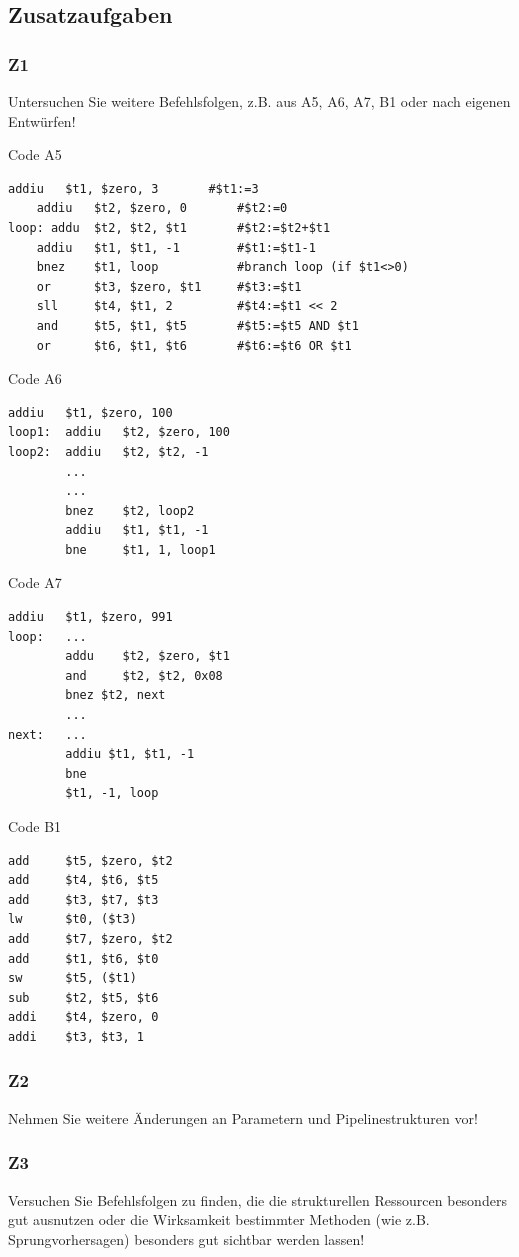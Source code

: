 \documentclass[a4paper,12pt,titlepage]{scrartcl}
\begin{document}
\subsection*{Zusatzaufgaben}
\subsubsection*{Z1}
Untersuchen Sie weitere Befehlsfolgen, z.B. aus A5, A6, A7, B1 oder nach eigenen Entwürfen!

Code A5
\begin{lstlisting}[basicstyle=\tiny]
    addiu   $t1, $zero, 3       #$t1:=3
    addiu   $t2, $zero, 0       #$t2:=0
loop: addu  $t2, $t2, $t1       #$t2:=$t2+$t1
    addiu   $t1, $t1, -1        #$t1:=$t1-1
    bnez    $t1, loop           #branch loop (if $t1<>0)
    or      $t3, $zero, $t1     #$t3:=$t1
    sll     $t4, $t1, 2         #$t4:=$t1 << 2
    and     $t5, $t1, $t5       #$t5:=$t5 AND $t1
    or      $t6, $t1, $t6       #$t6:=$t6 OR $t1
\end{lstlisting}

Code A6
\begin{lstlisting}[basicstyle=\tiny]
        addiu   $t1, $zero, 100
loop1:  addiu   $t2, $zero, 100
loop2:  addiu   $t2, $t2, -1
        ...
        ...
        bnez    $t2, loop2
        addiu   $t1, $t1, -1
        bne     $t1, 1, loop1
\end{lstlisting}

Code A7
\begin{lstlisting}[basicstyle=\tiny]
        addiu   $t1, $zero, 991
loop:   ...
        addu    $t2, $zero, $t1
        and     $t2, $t2, 0x08
        bnez $t2, next
        ...
next:   ...
        addiu $t1, $t1, -1
        bne
        $t1, -1, loop
\end{lstlisting}

Code B1
\begin{lstlisting}[basicstyle=\tiny]
add     $t5, $zero, $t2
add     $t4, $t6, $t5
add     $t3, $t7, $t3
lw      $t0, ($t3)
add     $t7, $zero, $t2
add     $t1, $t6, $t0
sw      $t5, ($t1)
sub     $t2, $t5, $t6
addi    $t4, $zero, 0
addi    $t3, $t3, 1
\end{lstlisting}

\subsubsection*{Z2}
Nehmen Sie weitere Änderungen an Parametern und Pipelinestrukturen vor!

\subsubsection*{Z3}
Versuchen Sie Befehlsfolgen zu finden, die die strukturellen Ressourcen besonders gut ausnutzen oder die Wirksamkeit bestimmter Methoden (wie z.B. Sprungvorhersagen) besonders gut sichtbar werden lassen!
\end{document}
